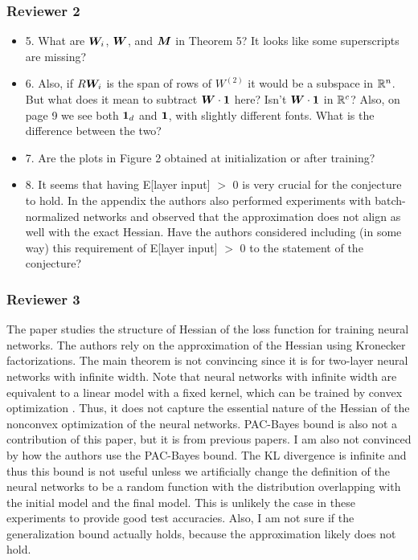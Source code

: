 \documentclass[12pt]{colt2022} %
\begin{document}
\subsubsection*{ Reviewer 2}
\begin{itemize}
\item 5. What are ${\bm{W}}_i$, ${\bm{W}}$, and ${\bm{M}}$ in Theorem 5? It looks like some superscripts are missing?

\item 6. Also, if $R{{\bm{W}}_i}$ is the span of rows of $W^{(2)}$ it would be a subspace in $\mathbb{R}^n$. But what does it mean to subtract ${{\bm{W}} \cdot \mathbf{1}}$ here? Isn't ${\bm{W}} \cdot \mathbf{1}$ in $\mathbb{R}^c$? Also, on page 9 we see both $\mathbf{1}_d$ and $\mathbf{1}$, with slightly different fonts. What is the difference between the two?

\item 7. Are the plots in Figure 2 obtained at initialization or after training?

\item 8. It seems that having E[layer input] $>$ 0 is very crucial for the conjecture to hold. In the appendix the authors also performed experiments with batch-normalized networks and observed that the approximation does not align as well with the exact Hessian. Have the authors considered including (in some way) this requirement of E[layer input] $>$ 0 to the statement of the conjecture?
\end{itemize}
\subsubsection*{ Reviewer 3 }

The paper studies the structure of Hessian of the loss function for training neural networks. The authors rely on the approximation of the Hessian using Kronecker factorizations. The main theorem is not convincing since it is for two-layer neural networks with infinite width. Note that neural networks with infinite width are equivalent to a linear model with a fixed kernel, which can be trained by convex optimization . Thus, it does not capture the essential nature of the Hessian of the nonconvex optimization of the neural networks. PAC-Bayes bound is also not a contribution of this paper, but it is from previous papers. I am also not convinced by how the authors use the PAC-Bayes bound. The KL divergence is infinite and thus this bound is not useful unless we artificially change the definition of the neural networks to be a random function with the distribution overlapping with the initial model and the final model. This is unlikely the case in these experiments to provide good test accuracies. Also, I am not sure if the generalization bound actually holds, because the approximation likely does not hold.
\end{document}
